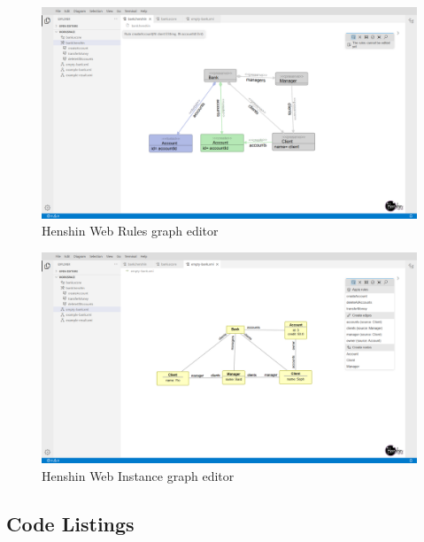\documentclass[conference,onecolumn]{IEEEtran}
\begin{document}
  \begin{figure}[H]
    \centering
    \includegraphics[width=1\textwidth]{rule-ui}
    \caption{Henshin Web Rules graph editor}
    \label{fig:rule-ui}
  \end{figure}

  \begin{figure}[H]
    \centering
    \includegraphics[width=1\textwidth]{xmi-ui}
    \caption{Henshin Web Instance graph editor}
    \label{fig:xmi-ui}
  \end{figure}

  \subsection{Code Listings}

    

    


  \printbibliography
\end{document}
